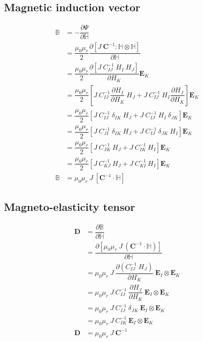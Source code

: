\documentclass[11pt,a4paper,final]{article}
\begin{document}
\subsection{Magnetic induction vector}
\begin{align*}
\mathbb{B} &= - \dfrac{\partial \Psi}{\partial \mathbb{H}} \\
&= \dfrac{\mu_0 \mu_r}{2} \dfrac{\partial [J \ \mathbf{C}^{-1} : \mathbb{H} \otimes \mathbb{H}]}{\partial \mathbb{H}} \\
&= \dfrac{\mu_0 \mu_r}{2} \dfrac{\partial [J \ C^{-1}_{IJ} \ H_I \ H_J	]}{\partial H_K} \mathbf{E}_K \\
&= \dfrac{\mu_0 \mu_r}{2} \left[ J \ C^{-1}_{IJ} \dfrac{\partial H_I}{\partial H_K} \ H_J + J \ C^{-1}_{IJ} \ H_I \dfrac{\partial H_J}{\partial H_K} \right] \mathbf{E}_K \\
&= \dfrac{\mu_0 \mu_r}{2} \left[ J \ C^{-1}_{IJ} \ \delta_{IK} \ H_J + J \ C^{-1}_{IJ} \ H_I \ \delta_{JK} \right] \mathbf{E}_K \\
&= \dfrac{\mu_0 \mu_r}{2} \left[ J \ C^{-1}_{JI} \ \delta_{IK} \ H_J + J \ C^{-1}_{IJ} \ \delta_{JK} \ H_I \right] \mathbf{E}_K \\
&= \dfrac{\mu_0 \mu_r}{2} \left[ J \ C^{-1}_{JK} \ H_J + J \ C^{-1}_{IK} \ H_I \right] \mathbf{E}_K \\
&= \dfrac{\mu_0 \mu_r}{2} \left[ J \ C^{-1}_{KJ} \ H_J + J \ C^{-1}_{KI} \ H_I \right] \mathbf{E}_K \\
\mathbb{B} &= \mu_0 \mu_r \ J \ [\mathbf{C}^{-1} \cdot \mathbb{H}]
\end{align*}

\subsection{Magneto-elasticity tensor}
\begin{align*}
\mathbf{D} &= \dfrac{\partial \mathbb{B}}{\partial \mathbb{H}} \\
&= \dfrac{\partial [\mu_0 \mu_r \ J \ (\mathbf{C}^{-1} \cdot \mathbb{H})]}{\partial \mathbb{H}} \\
&= \mu_0 \mu_r \ J \ \dfrac{\partial (C^{-1}_{IJ} \ H_J)}{\partial H_K} \ \mathbf{E}_I \otimes \mathbf{E}_K \\
&= \mu_0 \mu_r \ J \ C^{-1}_{IJ} \ \dfrac{\partial H_J}{\partial H_K} \ \mathbf{E}_I \otimes \mathbf{E}_K \\
&= \mu_0 \mu_r \ J \ C^{-1}_{IJ} \ \delta_{JK} \ \mathbf{E}_I \otimes \mathbf{E}_K \\
&= \mu_0 \mu_r \ J \ C^{-1}_{IK} \ \mathbf{E}_I \otimes \mathbf{E}_K \\
\mathbf{D} &= \mu_0 \mu_r \ J \ \mathbf{C}^{-1}
\end{align*}
\end{document}
